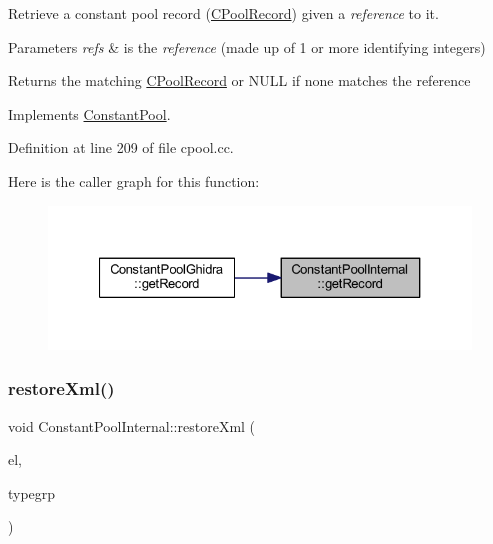 Retrieve a constant pool record (\mbox{\hyperlink{class_c_pool_record}{C\+Pool\+Record}}) given a {\itshape reference} to it. 


\begin{DoxyParams}{Parameters}
{\em refs} & is the {\itshape reference} (made up of 1 or more identifying integers) \\
\hline
\end{DoxyParams}
\begin{DoxyReturn}{Returns}
the matching \mbox{\hyperlink{class_c_pool_record}{C\+Pool\+Record}} or N\+U\+LL if none matches the reference 
\end{DoxyReturn}


Implements \mbox{\hyperlink{class_constant_pool_ac17df35ff1376311f62912d29bf26cad}{Constant\+Pool}}.



Definition at line 209 of file cpool.\+cc.

Here is the caller graph for this function\+:
\nopagebreak
\begin{figure}[H]
\begin{center}
\leavevmode
\includegraphics[width=327pt]{class_constant_pool_internal_a28cbe88a2aa77b21bbf7a8027485ad37_icgraph}
\end{center}
\end{figure}
\mbox{\label{class_constant_pool_internal_a28f4bf1f388ac9eb718f1790267b662d}} 
\subsubsection{\texorpdfstring{restoreXml()}{restoreXml()}}
{\footnotesize\ttfamily void Constant\+Pool\+Internal\+::restore\+Xml (\begin{DoxyParamCaption}\item[{const \mbox{\hyperlink{class_element}{Element}} $\ast$}]{el,  }\item[{\mbox{\hyperlink{class_type_factory}{Type\+Factory}} \&}]{typegrp }\end{DoxyParamCaption})\hspace{0.3cm}{\ttfamily [virtual]}}



